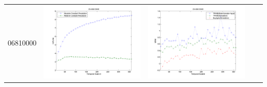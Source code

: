 \documentclass[11pt]{article}
\begin{document}
\begin{table}[H]
{\begin{tabular}{c  c   c   c  c }
06810000&\begin{minipage}{.4\textwidth}\includegraphics[width=\linewidth]{resultgraph/06810000e.png}\end{minipage}
&\begin{minipage}{.4\textwidth}\includegraphics[width=\linewidth]{resultgraph/06810000MI.png}\end{minipage}

\end{tabular}}
\end{table}
\end{document}
